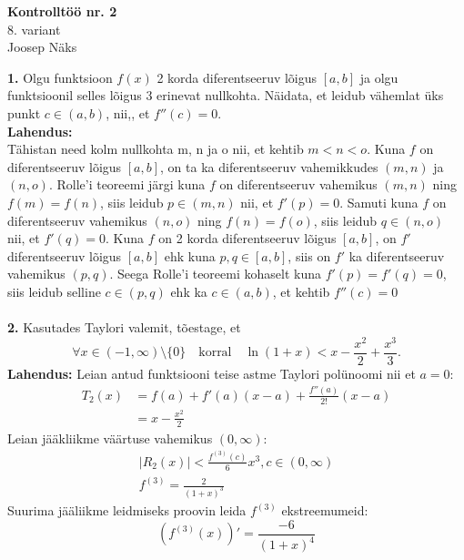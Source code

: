 \documentclass{article}
\begin{document}
\begin{center}
\Large\textbf{Kontrollt\"o\"o nr. 2}\\
8. variant\\
\small{Joosep N\"aks}
\end{center}
\textbf{1.} Olgu funktsioon $f(x)$ 2 korda diferentseeruv l\~oigus $[a,b]$ ja olgu funktsioonil selles l\~oigus 3 erinevat nullkohta. N\"aidata, et leidub v\"ahemlat \"uks punkt $c\in(a,b)$, nii,, et $f''(c)=0$.\\
\textbf{Lahendus:}\\
T\"ahistan need kolm nullkohta m, n ja o nii, et kehtib $m< n< o$. Kuna $f$ on diferentseeruv l\~oigus $[a,b]$, on ta ka diferentseeruv vahemikkudes $(m,n)$ ja $(n,o)$. Rolle'i teoreemi j\"argi kuna $f$ on diferentseeruv vahemikus $(m,n)$ ning $f(m)=f(n)$, siis leidub $p\in(m,n)$ nii, et $f'(p)=0$. Samuti kuna $f$ on diferentseeruv vahemikus $(n,o)$ ning $f(n)=f(o)$, siis leidub $q\in(n,o)$ nii, et $f'(q)=0$. Kuna $f$ on 2 korda diferentseeruv l\~oigus $[a,b]$, on $f'$ diferentseeruv l\~oigus $[a,b]$ ehk kuna $p,q\in[a,b]$, siis on $f'$ ka diferentseeruv vahemikus $(p,q)$. Seega Rolle'i teoreemi kohaselt kuna $f'(p)=f'(q)=0$, siis leidub selline $c\in(p,q)$ ehk ka $c\in(a,b)$, et kehtib $f''(c)=0$\\
\pagebreak\\
\textbf{2.} Kasutades Taylori valemit, t\~oestage, et
\begin{equation*}
\forall x\in(-1,\infty)\setminus\{0\}\quad\text{korral}\quad\ln(1+x)<x-\frac{x^2}{2}+\frac{x^3}{3}.
\end{equation*}
\textbf{Lahendus:}
Leian antud funktsiooni teise astme Taylori pol\"unoomi nii et $a=0$:
\begin{equation*}
\begin{aligned}
T_2(x)&=f(a)+f'(a)(x-a)+\frac{f''(a)}{2!}(x-a)\\
&=x-\frac{x^2}{2}
\end{aligned}
\end{equation*}
Leian j\"a\"akliikme v\"a\"artuse vahemikus $(0,\infty)$:
\begin{equation*}
\begin{aligned}
|R_2(x)|<\frac{f^{(3)}(c)}{6}x^3, c\in(0,\infty)\\
f^{(3)}=\frac{2}{(1+x)^3}
\end{aligned}
\end{equation*}
Suurima j\"a\"aliikme leidmiseks proovin leida $f^{(3)}$ ekstreemumeid:
\begin{equation*}
(f^{(3)}(x))'=\frac{-6}{(1+x)^4}
\end{equation*}
\end{document}
